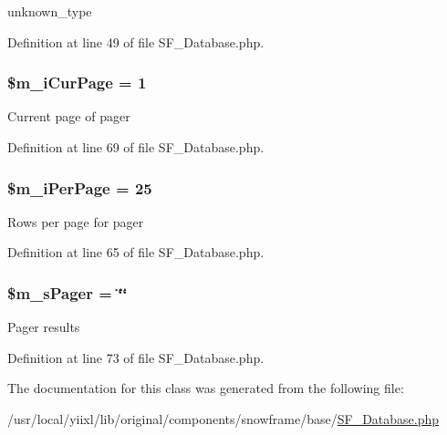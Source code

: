 unknown\_\-type 

Definition at line 49 of file SF\_\-Database.php.

\hypertarget{classSF__Database_a247553d616cac3fa76915f9f09fb59b2}{
\subsubsection[{\$m\_\-iCurPage}]{\setlength{\rightskip}{0pt plus 5cm}\$m\_\-iCurPage = 1}}
\label{classSF__Database_a247553d616cac3fa76915f9f09fb59b2}
Current page of pager 

Definition at line 69 of file SF\_\-Database.php.

\hypertarget{classSF__Database_a559f47903c9f09f15cb286680b3f767c}{
\subsubsection[{\$m\_\-iPerPage}]{\setlength{\rightskip}{0pt plus 5cm}\$m\_\-iPerPage = 25}}
\label{classSF__Database_a559f47903c9f09f15cb286680b3f767c}
Rows per page for pager 

Definition at line 65 of file SF\_\-Database.php.

\hypertarget{classSF__Database_a57f2664c28b26868140aa5445f5b1c95}{
\subsubsection[{\$m\_\-sPager}]{\setlength{\rightskip}{0pt plus 5cm}\$m\_\-sPager = \char`\"{}\char`\"{}}}
\label{classSF__Database_a57f2664c28b26868140aa5445f5b1c95}
Pager results 

Definition at line 73 of file SF\_\-Database.php.



The documentation for this class was generated from the following file:\begin{DoxyCompactItemize}
\item 
/usr/local/yiixl/lib/original/components/snowframe/base/\hyperlink{SF__Database_8php}{SF\_\-Database.php}\end{DoxyCompactItemize}
